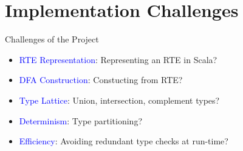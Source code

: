\section{Implementation Challenges}

{  %
\begin{frame}{Challenges of the Project}
  \begin{itemize}
  \item {}\textcolor{blue}{RTE Representation}:   Representing an RTE in Scala?
  \item {}\textcolor{blue}{DFA Construction}:  Constucting from RTE?
  \item {}\textcolor{blue}{Type Lattice}: Union, intersection, complement types?
  \item {}\textcolor{blue}{Determinism}: Type partitioning?
  \item {}\textcolor{blue}{Efficiency}:  Avoiding redundant type checks at run-time?
  \end{itemize}
\end{frame}
}

